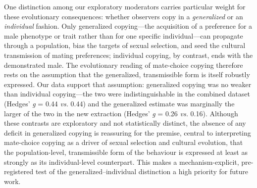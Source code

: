One distinction among our exploratory moderators carries particular weight for
these evolutionary consequences: whether observers copy in a \textit{generalized}
or an \textit{individual} fashion. Only generalized copying---the acquisition of a
preference for a male phenotype or trait rather than for one specific
individual---can propagate through a population, bias the targets of sexual
selection, and seed the cultural transmission of mating preferences; individual
copying, by contrast, ends with the demonstrated male. The evolutionary reading of
mate-choice copying therefore rests on the assumption that the generalized,
transmissible form is itself robustly expressed. Our data support that assumption:
generalized copying was no weaker than individual copying---the two were
indistinguishable in the combined dataset (Hedges' \textit{g} = 0.44 \textit{vs.}
0.44) and the generalized estimate was marginally the larger of the two in the new
extraction (Hedges' \textit{g} = 0.26 \textit{vs.} 0.16). Although these contrasts
are exploratory and not statistically distinct, the absence of any deficit in
generalized copying is reassuring for the premise, central to interpreting
mate-choice copying as a driver of sexual selection and cultural evolution, that
the population-level, transmissible form of the behaviour is expressed at least as
strongly as its individual-level counterpart. This makes a mechanism-explicit,
pre-registered test of the generalized--individual distinction a high priority for
future work.
